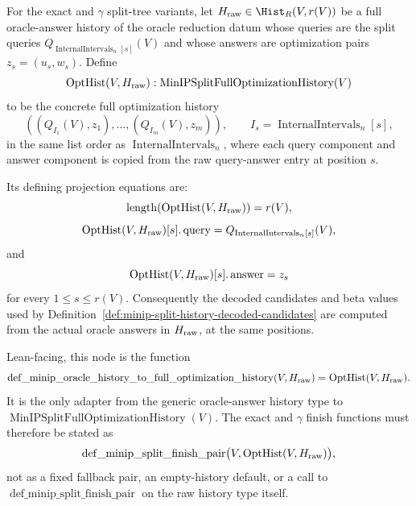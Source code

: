\begin{definition}
  \label{def:minip-oracle-history-to-full-optimization-history}
  For the exact and $\gamma$ split-tree variants, let
  $H_{\rm raw}\in\Hist_R(V,r(V))$ be a full oracle-answer history of the
  oracle reduction datum whose queries are the split queries
  $Q_{\operatorname{InternalIntervals}_n[s]}(V)$ and whose answers are
  optimization pairs $z_s=(u_s,w_s)$.  Define
  \[
    \operatorname{OptHist}(V,H_{\rm raw})
      :\operatorname{MinIPSplitFullOptimizationHistory}(V)
  \]
  to be the concrete full optimization history
  \[
    ((Q_{I_1}(V),z_1),\ldots,(Q_{I_m}(V),z_m)),
    \qquad
    I_s=\operatorname{InternalIntervals}_n[s],
  \]
  in the same list order as $\operatorname{InternalIntervals}_n$, where each
  query component and answer component is copied from the raw query-answer
  entry at position $s$.

  Its defining projection equations are:
  \[
    \operatorname{length}(\operatorname{OptHist}(V,H_{\rm raw}))=r(V),
  \]
  \[
    \operatorname{OptHist}(V,H_{\rm raw})[s].\operatorname{query}
      =
    Q_{\operatorname{InternalIntervals}_n[s]}(V),
  \]
  and
  \[
    \operatorname{OptHist}(V,H_{\rm raw})[s].\operatorname{answer}=z_s
  \]
  for every $1\leq s\leq r(V)$.  Consequently the decoded candidates and beta
  values used by
  Definition~\ref{def:minip-split-history-decoded-candidates} are computed
  from the actual oracle answers in $H_{\rm raw}$, at the same positions.

  Lean-facing, this node is the function
  \[
    \operatorname{def\_minip\_oracle\_history\_to\_full\_optimization\_history}
      (V,H_{\rm raw})
      =
    \operatorname{OptHist}(V,H_{\rm raw}).
  \]
  It is the only adapter from the generic oracle-answer history type to
  $\operatorname{MinIPSplitFullOptimizationHistory}(V)$.  The exact and
  $\gamma$ finish functions must therefore be stated as
  \[
    \operatorname{def\_minip\_split\_finish\_pair}
      \bigl(V,\operatorname{OptHist}(V,H_{\rm raw})\bigr),
  \]
  not as a fixed fallback pair, an empty-history default, or a call to
  $\operatorname{def\_minip\_split\_finish\_pair}$ on the raw history type
  itself.
\end{definition}

